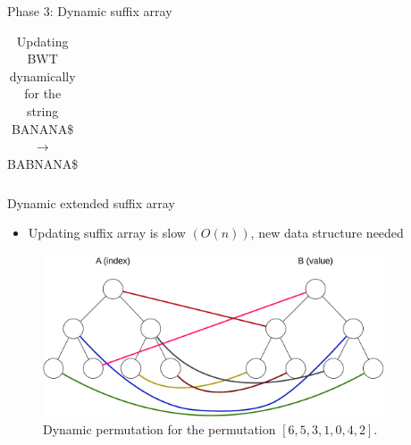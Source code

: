 \documentclass[aspectratio=1610, xcolor=table]{beamer}
\begin{document}
\begin{frame}[fragile]{Phase 3: Dynamic suffix array}
\begin{table}
\begin{center}
{\begin{tabular}{c | l | l l}
				\end{tabular}
			}
			\hspace{0.5cm}
			\caption{Updating BWT dynamically for the string BANANA\$ $\rightarrow$ BABNANA\$}
			\label{table:bwtupdatestages}
		\end{center}
	\end{table}
\end{frame}

\begin{frame}[fragile]{Dynamic extended suffix array}
    \begin{itemize}
        \item Updating suffix array is slow $(O(n))$, new data structure needed
    \end{itemize}
	\begin{figure}[t]
		\begin{center}
			\includegraphics[width=0.9\textwidth]{figures/dynamicpermutation1.drawio.pdf}
		\end{center}
		\caption{Dynamic permutation for the permutation $[6,5,3,1,0,4,2]$.}
		\label{fig:dynamicpermutation}
	\end{figure}
\end{frame}
\end{document}
